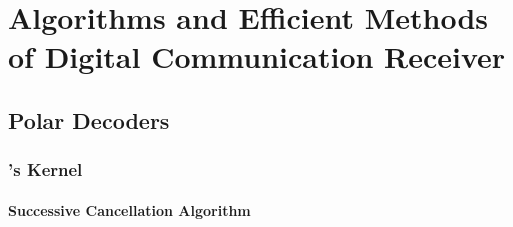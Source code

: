 \graphicspath{{main/chapter2/fig/}}

\chapter{Algorithms and Efficient Methods of Digital Communication Receiver}

\minitoccustom

\section{Polar Decoders}
\label{sec:alg_polar_decoders}

\subsection{\Arikan's Kernel}

\subsubsection{Successive Cancellation Algorithm}

